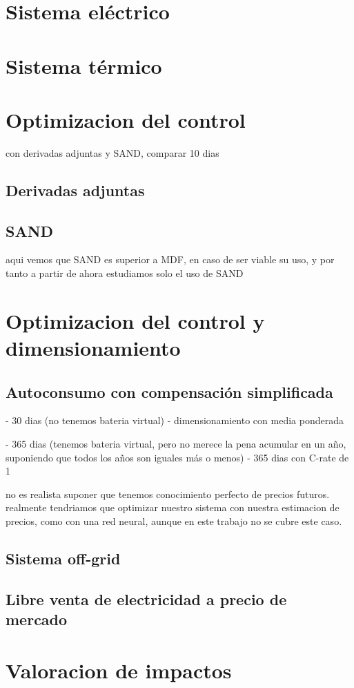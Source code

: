 \section{Sistema eléctrico}


\section{Sistema térmico}


\section{Optimizacion del control}

con derivadas adjuntas y SAND, comparar
10 dias

\subsection{Derivadas adjuntas}
\subsection{SAND}

aqui vemos que SAND es superior a MDF, en caso de ser viable su uso,
y por tanto a partir de ahora estudiamos solo el uso de SAND


\section{Optimizacion del control y dimensionamiento}
\subsection{Autoconsumo con compensación simplificada}
- 30 dias (no tenemos bateria virtual)
- dimensionamiento con media ponderada

- 365 dias (tenemos bateria virtual, pero no merece la pena acumular en un año, suponiendo que todos los años son iguales más o menos)
- 365 dias con C-rate de 1

no es realista suponer que tenemos conocimiento perfecto de precios futuros.
realmente tendriamos que optimizar nuestro sistema con nuestra estimacion
de precios, como con una red neural, aunque en este trabajo no se cubre este caso.

\subsection{Sistema off-grid}

\subsection{Libre venta de electricidad a precio de mercado}

\section{Valoracion de impactos}
